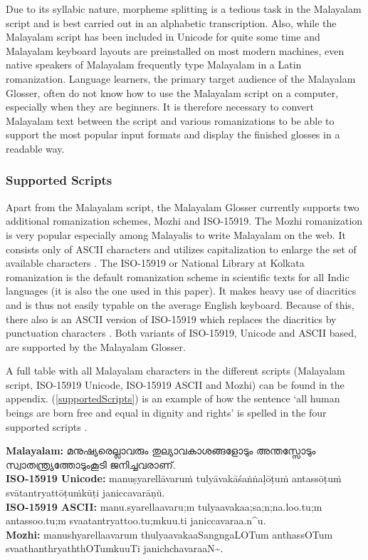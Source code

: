 \documentclass[a4paper]{article}
\begin{document}
Due to its syllabic nature, morpheme splitting is a tedious task in the Malayalam script and is best carried out in an alphabetic transcription. Also, while the Malayalam script has been included in Unicode for quite some time and Malayalam keyboard layouts are preinstalled on most modern machines, even native speakers of Malayalam frequently type Malayalam in a Latin romanization. Language learners, the primary target audience of the Malayalam Glosser, often do not know how to use the Malayalam script on a computer, especially when they are beginners. It is therefore necessary to convert Malayalam text between the script and various romanizations to be able to support the most popular input formats and display the finished glosses in a readable way.

\subsubsection{Supported Scripts}

Apart from the Malayalam script, the Malayalam Glosser currently supports two additional romanization schemes, Mozhi and ISO-15919. The Mozhi romanization is very popular especially among Malayalis to write Malayalam on the web. It consists only of ASCII characters and utilizes capitalization to enlarge the set of available characters \parencite{mozhi}. The ISO-15919 or National Library at Kolkata romanization is the default romanization scheme in scientific texts for all Indic languages (it is also the one used in this paper). It makes heavy use of diacritics and is thus not easily typable on the average English keyboard. Because of this, there also is an ASCII version of ISO-15919 which replaces the diacritics by punctuation characters \parencite{iso-15919}. Both variants of ISO-15919, Unicode and ASCII based, are supported by the Malayalam Glosser.

A full table with all Malayalam characters in the different scripts (Malayalam script, ISO-15919 Unicode, ISO-15919 ASCII and Mozhi) can be found in the appendix. (\ref{supportedScripts}) is an example of how the sentence `all human beings are born free and equal in dignity and rights' is spelled in the four supported scripts \parencite{malOmniglot}.

\ex
\textbf{Malayalam:} മനുഷ്യരെല്ലാവരും തുല്യാവകാശങ്ങളോടും അന്തസ്സോടും \\ സ്വാതന്ത്ര്യത്തോടുംകൂടി ജനിച്ചവരാണ്. \\[1ex]
\textbf{ISO-15919 Unicode:} manuṣyarellāvaruṁ tulyāvakāśaṅṅaḷōṭuṁ antassōṭuṁ svātantryattōṭuṁkūṭi janiccavarāṇŭ. \\[1ex]
\textbf{ISO-15919 ASCII:} manu.syarellaavaru;m tulyaavakaa;sa;n;na.loo.tu;m antassoo.tu;m svaatantryattoo.tu;mkuu.ti janiccavaraa.n\^{}u. \\[1ex]
\textbf{Mozhi:} manushyarellaavarum thulyaavakaaSangngaLOTum anthassOTum svaathanthryaththOTumkuuTi janichchavaraaN\textasciitilde{}.
\label{supportedScripts}\xe
\end{document}

